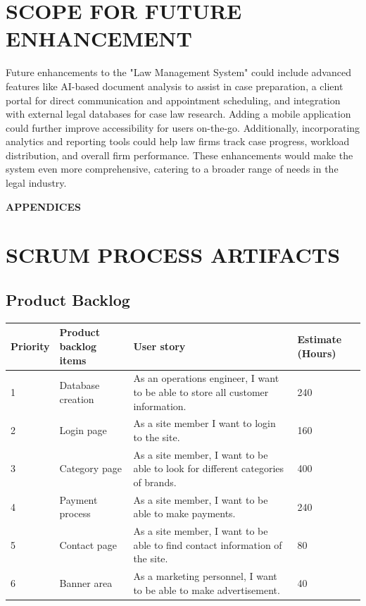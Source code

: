 \chapter{SCOPE FOR FUTURE ENHANCEMENT}
%
%
%
Future enhancements to the "Law Management System" could include advanced features like AI-based document analysis to assist in case preparation, a client portal for direct communication and appointment scheduling, and integration with external legal databases for case law research. Adding a mobile application could further improve accessibility for users on-the-go. Additionally, incorporating analytics and reporting tools could help law firms track case progress, workload distribution, and overall firm performance. These enhancements would make the system even more comprehensive, catering to a broader range of needs in the legal industry.
\clearpage
{}
\appendix
\quad\vfill
\begin{center}
{\Huge \bf APPENDICES}
\end{center}
\vfill
\clearpage
%
%
%
%
\chapter{SCRUM PROCESS ARTIFACTS}
%
\section{Product Backlog}
%
%
\renewcommand{\arraystretch}{1.25}
\begin{center}
\begin{tabular}{|m{}|m{}|m{}|m{}|}
\hline
{\bf Priority} & {\bf Product backlog items} & {\bf User story} & {\bf Estimate (Hours)}\\
\hline
1 & Database creation & As an operations engineer, I want to be able to store all customer information.  & 240 \\
\hline
2 & Login page & As a site member I want to login to the site. & 160 \\
\hline
3 & Category page & As a site member, I want to be able to look for different categories of brands. & 400\\
\hline
4 & Payment process & As a site member, I want to be able to make payments. & 240\\
\hline
5 & Contact page & As a site member, I want to be able to find contact information of the site. & 80 \\
\hline
6 & Banner area & As a marketing personnel, I want to be able to make advertisement. & 40\\
\hline
\end{tabular}
\end{center}
%
